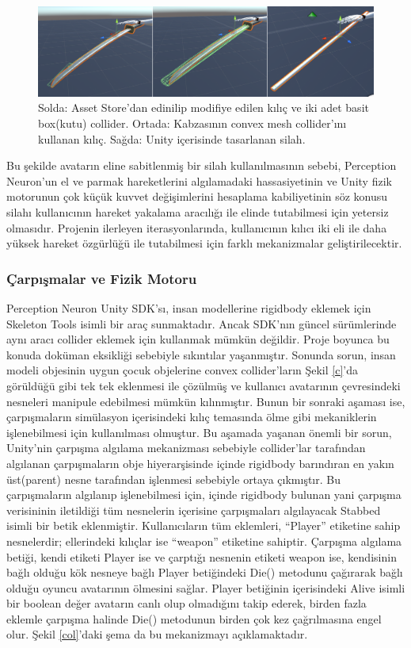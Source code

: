 \documentclass[a4paper, 12pt, titlepage]{article}
\begin{document}
\begin{figure}[ht!]
    \centering
        \includegraphics[width=6in]{images/s2}
    \caption{Solda: Asset Store'dan edinilip modifiye edilen kılıç ve iki adet basit box(kutu)
             collider. Ortada: Kabzasının convex mesh collider'ını kullanan kılıç. Sağda: Unity
             içerisinde tasarlanan silah.}
    \label{s}
\end{figure}

Bu şekilde avatarın eline sabitlenmiş bir silah kullanılmasının sebebi, Perception Neuron’un el ve
parmak hareketlerini algılamadaki hassasiyetinin ve Unity fizik motorunun çok küçük kuvvet
değişimlerini hesaplama kabiliyetinin söz konusu silahı kullanıcının hareket yakalama aracılığı ile
elinde tutabilmesi için yetersiz olmasıdır. Projenin ilerleyen iterasyonlarında, kullanıcının
kılıcı iki eli ile daha yüksek hareket özgürlüğü ile tutabilmesi için farklı mekanizmalar
geliştirilecektir.

\subsubsection{Çarpışmalar ve Fizik Motoru}
Perception Neuron Unity SDK’sı, insan modellerine rigidbody eklemek için Skeleton Tools isimli bir
araç sunmaktadır. Ancak SDK’nın güncel sürümlerinde aynı aracı collider eklemek için kullanmak
mümkün değildir. Proje boyunca bu konuda doküman eksikliği sebebiyle sıkıntılar yaşanmıştır.
Sonunda sorun, insan modeli objesinin uygun çocuk objelerine convex collider’ların Şekil \ref{c}’da
görüldüğü gibi tek tek eklenmesi ile çözülmüş ve kullanıcı avatarının çevresindeki nesneleri
manipule edebilmesi mümkün kılınmıştır. Bunun bir sonraki aşaması ise, çarpışmaların simülasyon
içerisindeki kılıç temasında ölme gibi mekaniklerin işlenebilmesi için kullanılması olmuştur. Bu
aşamada yaşanan önemli bir sorun, Unity’nin çarpışma algılama mekanizması sebebiyle collider’lar
tarafından algılanan çarpışmaların obje hiyerarşisinde içinde rigidbody barındıran en yakın
üst(parent) nesne tarafından işlenmesi sebebiyle ortaya çıkmıştır. Bu çarpışmaların algılanıp
işlenebilmesi için, içinde rigidbody bulunan yani çarpışma verisininin iletildiği tüm nesnelerin
içerisine çarpışmaları algılayacak Stabbed isimli bir betik eklenmiştir. Kullanıcıların tüm
eklemleri, “Player” etiketine sahip nesnelerdir; ellerindeki kılıçlar ise “weapon” etiketine
sahiptir. Çarpışma algılama betiği, kendi etiketi Player ise ve çarptığı nesnenin etiketi weapon
ise, kendisinin bağlı olduğu kök nesneye bağlı Player betiğindeki Die() metodunu çağırarak bağlı
olduğu oyuncu avatarının ölmesini sağlar. Player betiğinin içerisindeki Alive isimli bir boolean
değer avatarın canlı olup olmadığını takip ederek, birden fazla eklemle çarpışma halinde Die()
metodunun birden çok kez çağrılmasına engel olur. Şekil \ref{col}’daki şema da bu mekanizmayı
açıklamaktadır.
\end{document}
